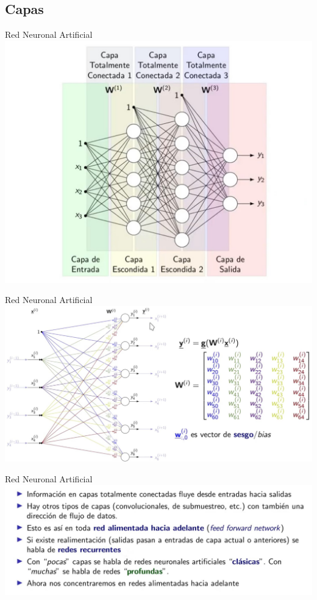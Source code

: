 \documentclass[8pt]{beamer}  %
\begin{document}
\subsection{Capas}
\begin{frame}{Red Neuronal Artificial}
\includegraphics[width=\textwidth]{im10}
\end{frame}
\begin{frame}{Red Neuronal Artificial}
\includegraphics[width=\textwidth]{im11}
\end{frame}
\begin{frame}{Red Neuronal Artificial}
\includegraphics[width=\textwidth]{im12}
\end{frame}
\end{document}
